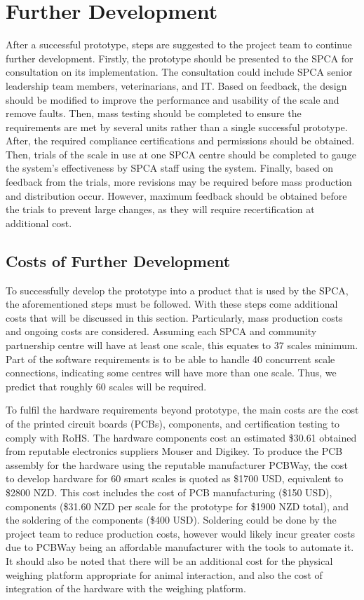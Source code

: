 \section{Further Development}

After a successful prototype, steps are suggested to the project team to continue further development. Firstly, the prototype should be presented to the SPCA for consultation on its implementation. The consultation could include SPCA senior leadership team members, veterinarians, and IT. Based on feedback, the design should be modified to improve the performance and usability of the scale and remove faults. Then, mass testing should be completed to ensure the requirements are met by several units rather than a single successful prototype. After, the required compliance certifications and permissions should be obtained. Then, trials of the scale in use at one SPCA centre should be completed to gauge the system’s effectiveness by SPCA staff using the system. Finally, based on feedback from the trials, more revisions may be required before mass production and distribution occur. However, maximum feedback should be obtained before the trials to prevent large changes, as they will require recertification at additional cost.


\subsection{Costs of Further Development}

To successfully develop the prototype into a product that is used by the SPCA, the aforementioned steps must be followed. With these steps come additional costs that will be discussed in this section. Particularly, mass production costs and ongoing costs are considered. Assuming each SPCA and community partnership centre will have at least one scale, this equates to 37 scales minimum. Part of the software requirements is to be able to handle 40 concurrent scale connections, indicating some centres will have more than one scale. Thus, we predict that roughly 60 scales will be required.

To fulfil the hardware requirements beyond prototype, the main costs are the cost of the printed circuit boards (PCBs), components, and certification testing to comply with RoHS. The hardware components cost an estimated \$30.61 obtained from reputable electronics suppliers Mouser and Digikey. To produce the PCB assembly for the hardware using the reputable manufacturer PCBWay, the cost to develop hardware for 60 smart scales is quoted as \$1700 USD, equivalent to \$2800 NZD. This cost includes the cost of PCB manufacturing (\$150 USD), components (\$31.60 NZD per scale for the prototype for \$1900 NZD total), and the soldering of the components (\$400 USD). Soldering could be done by the project team to reduce production costs, however would likely incur greater costs due to PCBWay being an affordable manufacturer with the tools to automate it. It should also be noted that there will be an additional cost for the physical weighing platform appropriate for animal interaction, and also the cost of integration of the hardware with the weighing platform. 

